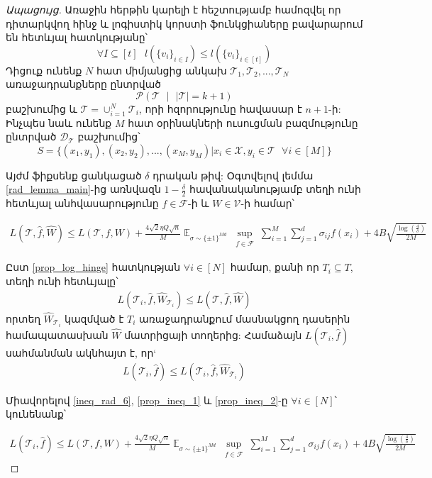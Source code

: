 \documentclass[11pt]{article}
\DeclareMathOperator*{\E}{\mathbb{E}}
\begin{document}
\begin{proof}[Ապացույց] Առաջին հերթին կարելի է հեշտությամբ համոզվել որ դիտարկվող հինջ և լոգիստիկ կորստի ֆունկցիաները բավարարում են հետևյալ հատկությանը՝
\begin{equation}
\label{prop_log_hinge}
\forall I \subseteq [t] \text{   }   l(\{v_i\}_{i\in I}) \leq l(\{v_i\}_{i \in [t]})
\end{equation}
Դիցուք ունենք $N$ հատ միմյանցից անկախ $\mathcal{T}_1,\mathcal{T}_2, ...,\mathcal{T}_N$  առաջադրանքները ընտրված 
$$\mathcal{P}(\mathcal{T} \text{ } |\text{ }  |\mathcal{T}| = k +1)$$
բաշխումից և $\mathcal{T} = \cup_{i=1}^N\mathcal{T}_i$, որի հզորությունը հավասար է $n+1$-ի: Ինչպես նաև ունենք $M$ հատ օրինակների ուսուցման բազմությունը ընտրված $\mathcal{D_\mathcal{T}}$ բաշխումից՝
$$S = \{(x_1, y_1), (x_2, y_2), ..., (x_M, y_M) | x_i \in \mathcal{X}, y_i \in \mathcal{T} \text{ }\forall i \in[M]\}$$

\noindent Այժմ ֆիքսենք ցանկացած $\delta$ դրական թիվ: Օգտվելով լեմմա \ref{rad_lemma_main}-ից առնվազն $1-\frac{\delta}{2}$ հավանականությամբ տեղի ունի հետևյալ անհվասարությունը $f \in \mathcal{F}$-ի և $W \in \mathcal{V}$-ի համար՝

\begin{align}
\label{ineq_rad_6}
L(\mathcal{T}, \hat{f}, \hat{W}) \leq  L(\mathcal{T}, f, W) + \frac{4\sqrt{2} \eta Q\sqrt{n}}{M} \E_{\sigma \sim \{\pm1\}^{Md}} \sup_{\substack{ f  \in \mathcal{F}  }}\sum_{i=1}^M \sum_{j=1}^d \sigma_{ij}f(x_i)+    4B\sqrt{\frac{\log \left( \frac{4}{\delta} \right)}{2M}}
\end{align}

\noindent Ըստ \ref{prop_log_hinge} հատկության $\forall i \in [N]$ համար, քանի որ $T_i \subseteq T$, տեղի ունի հետևյալը՝
\begin{align}
\label{prop_ineq_1}
L(\mathcal{T}_i, \hat{f}, \hat{W}_{\mathcal{T}_i}) \leq L(\mathcal{T}, \hat{f}, \hat{W} )
\end{align}
 որտեղ $\hat{W}_{\mathcal{T}_i}$ կազմված է $T_i$ առաջադրանքում մասնակցող դասերին համապատասխան  $\hat{W}$ մատրիցայի տողերից: Համաձայն $L(\mathcal{T}_i, \hat{f})$ սահմանման ակնհայտ է, որ` 
\begin{align}
\label{prop_ineq_2}
L(\mathcal{T}_i, \hat{f}) \leq L(\mathcal{T}_i, \hat{f}, \hat{W}_{\mathcal{T}_i})
\end{align}

Միավորելով \ref{ineq_rad_6}, \ref{prop_ineq_1}  և \ref{prop_ineq_2}-ը $\forall i \in [N]$՝ կունենանք՝


\begin{align}
\label{ineq_rad_7}
L(\mathcal{T}_i, \hat{f}) \leq  L(\mathcal{T}, f, W) + \frac{4\sqrt{2} \eta Q\sqrt{n}}{M} \E_{\sigma \sim \{\pm1\}^{Md}} \sup_{\substack{ f  \in \mathcal{F}  }}\sum_{i=1}^M \sum_{j=1}^d \sigma_{ij}f(x_i)+    4B\sqrt{\frac{\log \left( \frac{4}{\delta} \right)}{2M}}
\end{align}


\end{proof}
\end{document}
